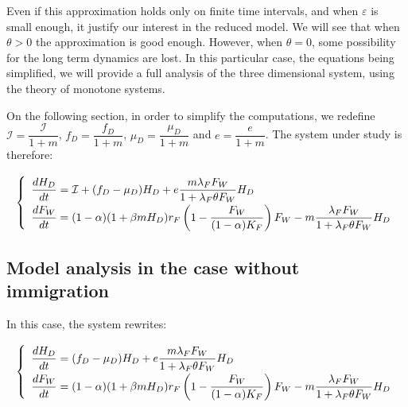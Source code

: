 \documentclass{article}
\newcommand{\lfw}{\lambda_{F}}
\newcommand{\lfw}{\lambda_{F}}
\newcommand{\cI}{\mathcal{I}}
\renewcommand{\epsilon}{\varepsilon}
\begin{document}
Even if this approximation holds only on finite time intervals, and when $\epsilon$ is small enough, it justify our interest in the reduced model. We will see that when $\theta > 0$ the approximation is good enough. However, when $\theta = 0 $, some possibility for the long term dynamics are lost. In this particular case, the equations being simplified, we will provide a full analysis of the three dimensional system, using the theory of monotone systems.


On the following section, in order to simplify the computations, we redefine $\cI = \dfrac{\cI}{1 + m}$, $f_D = \dfrac{f_D}{1+ m}$, $\mu_D = \dfrac{\mu_D}{1+ m}$ and $e = \dfrac{e}{1+m}$. The system under study is therefore:

\begin{equation}
\def\arraystretch{2}
\left\lbrace \begin{array}{l}
\dfrac{dH_D}{dt} = \cI + (f_D - \mu_D) H_D + e  \dfrac{m \lfw F_W }{1 + \lfw \theta F_W}H_D \\
\dfrac{dF_W}{dt} = (1-\alpha) (1+\beta m H_D) r_F \left(1 - \dfrac{F_W}{(1-\alpha)K_F} \right) F_W - m \dfrac{\lfw F_W}{1 + \lfw \theta F_W} H_D 
\end{array} \right.
\label{QSSA}
\end{equation}



\subsection{Model analysis in the case without immigration}
In this case, the system rewrites:

\begin{equation}
\def\arraystretch{2}
\left\lbrace \begin{array}{l}
\dfrac{dH_D}{dt} = (f_D - \mu_D) H_D + e  \dfrac{m \lfw F_W }{1 + \lfw \theta F_W}H_D \\
\dfrac{dF_W}{dt} = (1-\alpha) (1+\beta m H_D) r_F \left(1 - \dfrac{F_W}{(1-\alpha)K_F} \right) F_W - m \dfrac{\lfw F_W}{1 + \lfw \theta F_W} H_D 
\end{array} \right.
\label{QSSA, I=0}
\end{equation}
\end{document}
